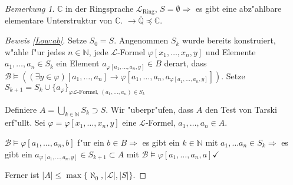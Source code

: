 \documentclass[a4paper,12pt,numbers=noenddot,parskip=full]{scrartcl}
\newcommand{\setN}{\mathbb{N}}
\newcommand{\setQ}{\mathbb{Q}}
\newcommand{\setC}{\mathbb{C}}
\newcommand{\scrL}{\mathcal{L}}
\newcommand{\scrB}{\mathcal{B}}
\theoremstyle{dotless}
\theoremstyle{remark}
\newtheorem*{remark}{Bemerkung}
\begin{document}
\begin{remark}
	$\setC$ in der Ringsprache $\scrL_\text{Ring}$, $S=\emptyset \Rightarrow$ es gibt eine abz"ahlbare elementare Unterstruktur von $\setC$. $\rightarrow \overline{\setQ} \preceq \setC$.
\end{remark}

\begin{proof}[Beweis \ref{Low:ab}]
	Setze $S_0 = S$. Angenommen $S_k$ wurde bereits konstruiert, w"ahle f"ur jedes $n \in \setN$, jede $\scrL$-Formel $\varphi[x_1, \dots, x_n, y]$ und Elemente $a_1, \dots, a_n \in S_k$ ein Element $a_{\varphi[a_1, \dots, a_n, y]} \in B$ derart, dass $\scrB \models ((\exists y \in \varphi)[a_1, \dots, a_n] \rightarrow \varphi[a_1, \dots, a_n, a_{\varphi[a_1, \dots, a_n, y]}])$. Setze $S_{k+1} = S_k \cup \{a_\varphi\}_{\varphi \scrL \text{-Formel, }(a_1, \dots, a_n)\in S_k}$
	
	Definiere $A = \underset{k \in \setN}{\bigcup} S_k \supset S$. Wir "uberpr"ufen, dass $A$ den Test von Tarski erf"ullt. Sei $\varphi = \varphi[x_1, \dots, x_n, y]$ eine $\scrL$-Formel, $a_1, \dots, a_n \in A$.
	
	$\scrB \models \varphi[a_1, \dots, a_n, b]$ f"ur ein $b \in B \Rightarrow$ es gibt ein $k \in \setN$ mit $a_1, \dots a_n \in S_k \Rightarrow$ es gibt ein $a_{\varphi[a_1, \dots, a_n, y]} \in S_{k+1} \subset A$ mit $\scrB \models \varphi[a_1, \dots, a_n, a] \checkmark$
	
	Ferner ist $|A| \leq \max \{\aleph_0, |\scrL|, |S|\}$.
\end{proof}
\end{document}
